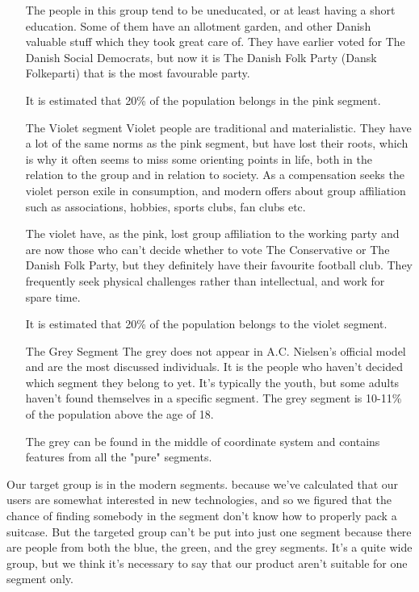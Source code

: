 \begin{itemize}
The people in this group tend to be uneducated, or at least having a short education. Some of them have an allotment garden, and other Danish valuable stuff which they took great care of. They have earlier voted for The Danish Social Democrats, but now it is The Danish Folk Party (Dansk Folkeparti) that is the most favourable  party.

It is estimated that 20\% of the population belongs in the pink segment.

\item[The Violet segment]
Violet people are traditional and materialistic. They have a lot of the same norms as the pink segment, but have lost their roots, which is why it often seems to miss some orienting points in life, both in the relation to the group and in relation to society. As a compensation seeks the violet person exile in consumption, and modern offers about group affiliation such as associations, hobbies, sports clubs, fan clubs etc. 

The violet have, as the pink, lost group affiliation to the working party and are now those who can't decide whether to vote The Conservative or The Danish Folk Party, but they definitely have their favourite football club. They frequently seek physical challenges rather than intellectual, and work for spare time.

It is estimated that 20\% of the population belongs to the violet segment.

\item[The Grey Segment]
The grey does not appear in A.C. Nielsen's official model and are the most discussed individuals. It is the people who haven't decided which segment they belong to yet. It's typically the youth, but some adults haven't found themselves in a specific segment. The grey segment is 10-11\% of the population above the age of 18.

The grey can be found in the middle of coordinate system and contains features from all the "pure" segments.
\end{itemize}
\citep{minerva}

Our target group is in the modern segments. because we've calculated that our users are somewhat interested in new technologies, and so we figured that the chance of finding somebody in the segment don't know how to properly pack a suitcase. But the targeted group can't be put into just one segment because there are people from both the blue, the green, and the grey segments. It's a quite wide group, but we think it's necessary to say that our product aren't suitable for one segment only.